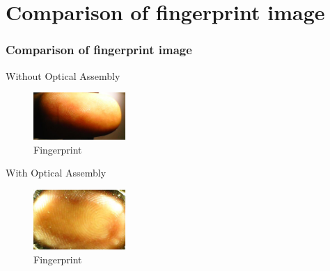 \documentclass[12pt]{beamer}
\begin{document}
\section{Comparison of fingerprint image}
\begin{frame}[c]
\frametitle{Comparison of fingerprint image}
Without Optical Assembly
\begin{figure}
 \centering
 \includegraphics[width=3.5cm]{./fp.jpg}
 \caption{Fingerprint}
\end{figure}
With Optical Assembly
\begin{figure}
 \centering
 \includegraphics[width=3.5cm]{./fp1.jpg}
 \caption{Fingerprint}
\end{figure}
\end{frame}
\end{document}

